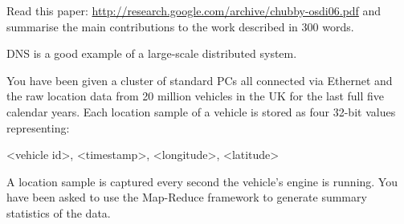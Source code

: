 \documentclass{supervision}
\begin{document}
  \begin{questions}
    \question Read this paper:
      \url{http://research.google.com/archive/chubby-osdi06.pdf} and summarise
      the main contributions to the work described in 300 words.

    \question DNS is a good example of a large-scale distributed system.

    \question You have been given a cluster of standard PCs all connected via
      Ethernet and the raw location data from 20 million vehicles in the UK
      for the last full five calendar years. Each location sample of a vehicle
      is stored as four 32-bit values representing:

      \begin{code}{}
        <vehicle id>, <timestamp>, <longitude>, <latitude>
      \end{code}

      A location sample is captured every second the vehicle's engine is
      running. You have been asked to use the Map-Reduce framework to generate
      summary statistics of the data.

      \begin{parts}

\end{parts}
\end{questions}
\end{document}
